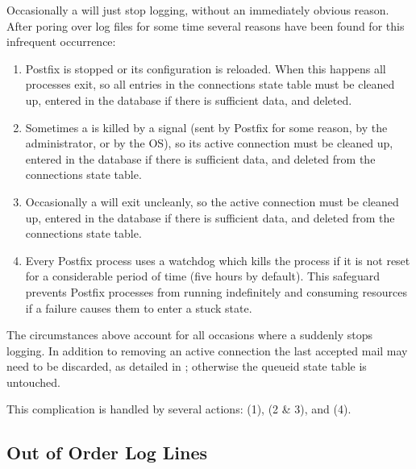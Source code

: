 \label{smtpd stops logging}

Occasionally a  will just stop logging, without an
immediately obvious reason.  After poring over log files for some time
several reasons have been found for this infrequent occurrence:

\begin{enumerate}

    \item Postfix is stopped or its configuration is reloaded.  When this
        happens all  processes exit, so all entries in the
        connections state table must be cleaned up, entered in the database
        if there is sufficient data, and deleted.

    \item Sometimes a  is killed by a signal (sent by Postfix
        for some reason, by the administrator, or by the OS), so its active
        connection must be cleaned up, entered in the database if there is
        sufficient data, and deleted from the connections state table.

    \item Occasionally a  will exit uncleanly, so the active
        connection must be cleaned up, entered in the database if there is
        sufficient data, and deleted from the connections state table.

    \item Every Postfix process uses a watchdog which kills the process if
        it is not reset for a considerable period of time (five hours by
        default).  This safeguard prevents Postfix processes from running
        indefinitely and consuming resources if a failure causes them to
        enter a stuck state.

\end{enumerate}

The circumstances above account for all occasions where a 
suddenly stops logging.  In addition to removing an active connection the
last accepted mail may need to be discarded, as detailed in
; otherwise the queueid state table
is untouched.

This complication is handled by several actions:  (1),
 (2 \& 3), and  (4).

\subsection{Out of Order Log Lines}

